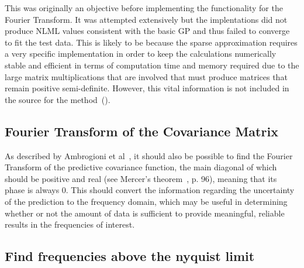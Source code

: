 \documentclass[12pt]{article}
\begin{document}
    This was originally an objective before implementing the functionality for the Fourier Transform.
    It was attempted extensively but the implentations did not produce NLML values consistent with the basic GP and thus failed to converge to fit the test data.
    This is likely to be because the sparse approximation requires a very specific implementation in order to keep the calculations numerically stable and efficient in terms of computation time and memory required due to the large matrix multiplications that are involved that must produce matrices that remain positive semi-definite.
    However, this vital information is not included in the source for the method~(\cite{q-candela}).

    \subsection{Fourier Transform of the Covariance Matrix}
    As described by Ambrogioni et al~\cite{Ambrogioni2018}, it should also be possible to find the Fourier Transform of the predictive covariance function, the main diagonal of which should be positive and real (see Mercer's theorem~\cite{rasmussen2006gaussian}, p. 96), meaning that its phase is always 0.
    This should convert the information regarding the uncertainty of the prediction to the frequency domain, which may be useful in determining whether or not the amount of data is sufficient to provide meaningful, reliable results in the frequencies of interest.


    \subsection{Find frequencies above the nyquist limit}

    \FloatBarrier

    \newpage
    \printbibliography
    \newpage
    
\end{document}
